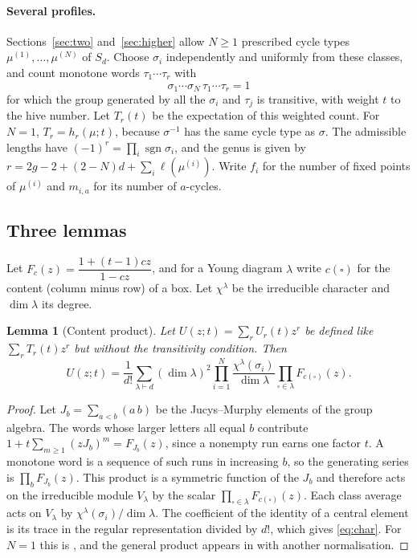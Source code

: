 \documentclass[11pt,a4paper]{article}
\newtheorem{lemma}[theorem]{Lemma}
\theoremstyle{definition}\newtheorem{definition}[theorem]{Definition}
\theoremstyle{remark}\newtheorem{remark}[theorem]{Remark}\newtheorem{example}[theorem]{Example}
\DeclareMathOperator{\sgn}{sgn}
\numberwithin{equation}{section}
\begin{document}
\paragraph{Several profiles.}
Sections~\ref{sec:two} and~\ref{sec:higher} allow $N\ge1$ prescribed cycle types $\mu^{(1)},\dots,\mu^{(N)}$ of $S_d$. Choose $\sigma_i$ independently and uniformly from these classes, and count monotone words $\tau_1\cdots\tau_r$ with
\[
 \sigma_1\cdots\sigma_N\,\tau_1\cdots\tau_r=1
\]
for which the group generated by all the $\sigma_i$ and $\tau_j$ is transitive, with weight $t$ to the hive number. Let $T_r(t)$ be the expectation of this weighted count. For $N=1$, $T_r=h_r(\mu;t)$, because $\sigma^{-1}$ has the same cycle type as $\sigma$. The admissible lengths have $(-1)^r=\prod_i\sgn\sigma_i$, and the genus is given by $r=2g-2+(2-N)d+\sum_i\ell(\mu^{(i)})$. Write $f_i$ for the number of fixed points of $\mu^{(i)}$ and $m_{i,a}$ for its number of $a$-cycles.

\subsection{Three lemmas}
Let $F_c(z)=\dfrac{1+(t-1)cz}{1-cz}$, and for a Young diagram $\lambda$ write $c(\square)$ for the content (column minus row) of a box. Let $\chi^\lambda$ be the irreducible character and $\dim\lambda$ its degree.

\begin{lemma}[Content product]\label{lem:content}
Let $U(z;t)=\sum_r U_r(t)z^r$ be defined like $\sum_rT_r(t)z^r$ but without the transitivity condition. Then
\begin{equation}\label{eq:char}
 U(z;t)=\frac{1}{d!}\sum_{\lambda\vdash d}(\dim\lambda)^2\prod_{i=1}^N\frac{\chi^\lambda(\sigma_i)}{\dim\lambda}\prod_{\square\in\lambda}F_{c(\square)}(z).
\end{equation}
\end{lemma}
\begin{proof}
Let $J_b=\sum_{a<b}(a\,b)$ be the Jucys--Murphy elements of the group algebra. The words whose larger letters all equal $b$ contribute $1+t\sum_{m\ge1}(zJ_b)^m=F_{J_b}(z)$, since a nonempty run earns one factor $t$. A monotone word is a sequence of such runs in increasing $b$, so the generating series is $\prod_bF_{J_b}(z)$. This product is a symmetric function of the $J_b$ and therefore acts on the irreducible module $V_\lambda$ by the scalar $\prod_{\square\in\lambda}F_{c(\square)}(z)$. Each class average acts on $V_\lambda$ by $\chi^\lambda(\sigma_i)/\dim\lambda$. The coefficient of the identity of a central element is its trace in the regular representation divided by $d!$, which gives \eqref{eq:char}. For $N=1$ this is \cite[Proposition~3.3]{cdm}, and the general product appears in \cite[Eq.~(1.26)]{alr} with another normalisation.
\end{proof}
\end{document}
